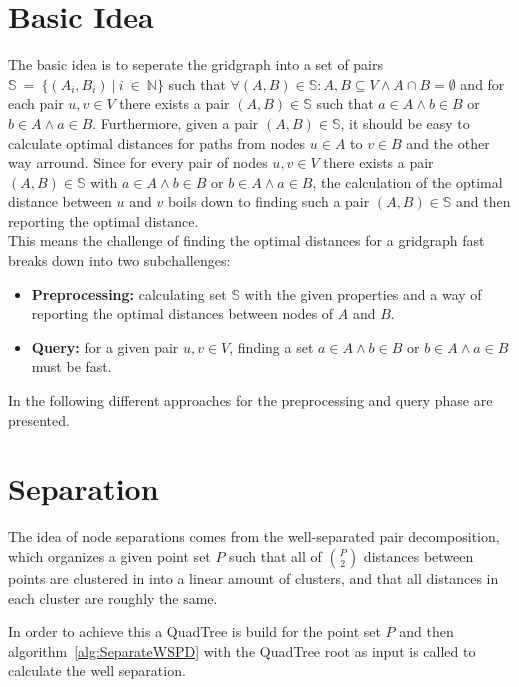 \documentclass{article}
\begin{document}
\section{Basic Idea}
The basic idea is to seperate the gridgraph into a set of pairs
$\mathbb{S}~=~\{(A_i, B_i)~|~i~\in~\mathbb{N}\}$
such that $\forall (A, B) \in \mathbb{S}: A, B \subseteq V \land A \cap B = \emptyset$
and for each pair $u, v \in V$ there exists a pair $(A, B) \in \mathbb{S}$ such that $a \in A \land b \in B$ or
$b \in A \land a \in B$.
Furthermore, given a pair $(A, B) \in \mathbb{S}$, it should be easy to calculate optimal distances for paths from nodes $u \in A$
to $v \in B$ and the other way arround.
Since for every pair of nodes $u, v \in V$ there exists a pair $(A, B) \in \mathbb{S}$ with $a \in A \land b \in B$ or
$b \in A \land a \in B$, the calculation of the optimal distance between $u$ and $v$ boils down to finding such a pair $(A, B) \in\mathbb{S}$
and then reporting the optimal distance.
\quad\\



This means the challenge of finding the optimal distances for a gridgraph fast breaks down into two subchallenges:
\begin{itemize}
\item \textbf{Preprocessing:} calculating set $\mathbb{S}$ with the given properties and a way of reporting the optimal distances between nodes of $A$ and $B$.
\item \textbf{Query:} for a given pair $u, v \in V$, finding a set $a \in A \land b \in B$ or $b \in A \land a \in B$ must be fast.
\end{itemize}

In the following different approaches for the preprocessing and query phase are presented.

\section{Separation}
The idea of node separations comes from the well-separated pair decomposition, which organizes a given point set $P$
such that all of $\binom{P}{2}$ distances between points are clustered in into a linear amount of clusters,
and that all distances in each cluster are roughly the same.

In order to achieve this a QuadTree is build for the point set $P$ and then algorithm~\ref{alg:SeparateWSPD}
with the QuadTree root as input is called to calculate the well separation.
\end{document}
